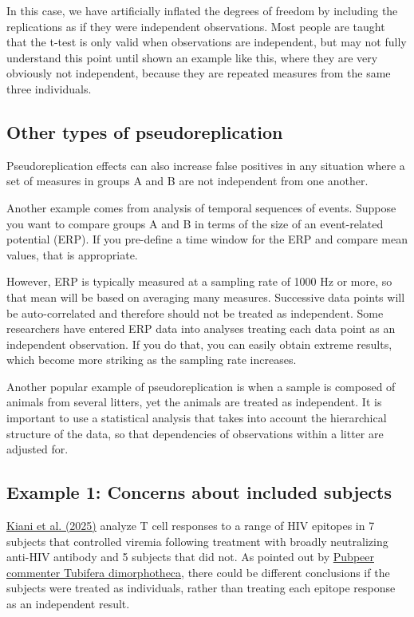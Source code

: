 \documentclass[letterpaper, 12pt]{article}
\begin{document}
In this case, we have artificially inflated the degrees of freedom by including the replications as if they were independent observations. Most people are taught that the t-test is only valid when observations are independent, but may not fully understand this point until shown an example like this, where they are very obviously not independent, because they are repeated measures from the same three individuals.

\subsection*{Other types of pseudoreplication}

Pseudoreplication effects can also increase false positives in any situation where a set of measures in groups A and B are not independent from one another.

Another example comes from analysis of temporal sequences of events. Suppose you want to compare groups A and B in terms of the size of an event-related potential (ERP). If you pre-define a time window for the ERP and compare mean values, that is appropriate. 

However, ERP is typically measured at a sampling rate of 1000 Hz or more, so that mean will be based on averaging many measures. Successive data points will be auto-correlated and therefore should not be treated as independent. Some researchers have entered ERP data into analyses treating each data point as an independent observation. If you do that, you can easily obtain extreme results, which become more striking as the sampling rate increases.

Another popular example of pseudoreplication is when a sample is composed of animals from several litters, yet the animals are treated as independent. It is important to use a statistical analysis that takes into account the hierarchical structure of the data, so that dependencies of observations within a litter are adjusted for.

\subsection*{Example 1: Concerns about included subjects}

\href{https://doi.org/10.1038/s41586-025-09932-w}{Kiani et al. (2025)} analyze T cell responses to a range of HIV epitopes in 7 subjects that controlled viremia following treatment with broadly neutralizing anti-HIV antibody and 5 subjects that did not.
As pointed out by \href{https://pubpeer.com/publications/469D3F4CC919EFBDC4187B81782160}{Pubpeer commenter Tubifera dimorphotheca}, there could be different conclusions if the subjects were treated as individuals, rather than treating each epitope response as an independent result. 
\end{document}
